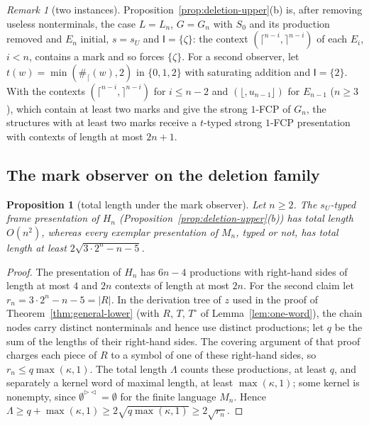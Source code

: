 \documentclass[11pt]{article}
\numberwithin{equation}{section}
\theoremstyle{plain}
\newtheorem{proposition}[theorem]{Proposition}
\theoremstyle{definition}
\theoremstyle{remark}
\newtheorem{remark}[theorem]{Remark}
\theoremstyle{plain}
\newcommand{\RL}{^{\rhd\lhd}}
\newcommand{\Lfl}{\lfloor}
\newcommand{\Rfl}{\rfloor}
\newcommand{\Lce}{\lceil}
\newcommand{\Rce}{\rceil}
\begin{document}
\begin{remark}[two instances]\label{rem:ideal-examples}
Proposition~\ref{prop:deletion-upper}(b) is, after removing useless
nonterminals, the case $L=L_n$, $G=G_n$ with
$S_0$ and its production removed and $E_n$ initial, $s=s_U$ and $\mathsf I=\{\zeta\}$: the context
$(\Lce^{n-i},\Rce^{n-i})$ of each $E_i$, $i<n$, contains a mark and so forces
$\{\zeta\}$.  For a second observer, let $t(w)=\min(\#_{\Lce}(w),2)$ in
$\{0,1,2\}$ with saturating addition and $\mathsf I=\{2\}$.  With the
contexts $(\Lce^{n-i},\Rce^{n-i})$ for $i\le n-2$ and $(\Lfl,u_{n-1}\Rfl)$ for
$E_{n-1}$ ($n\ge3$), which contain at least two marks and give the strong
$1$-FCP of $G_n$, the structures with at least two marks receive a
$t$-typed strong $1$-FCP presentation with contexts of length at most
$2n+1$.
\end{remark}

\subsection*{The mark observer on the deletion family}

\begin{proposition}[total length under the mark observer]\label{prop:mark-total}
Let $n\ge2$.  The $s_U$-typed frame presentation of $H_n$
(Proposition~\ref{prop:deletion-upper}(b)) has total length $O(n^2)$, whereas
every exemplar presentation of $M_n$, typed or not, has total length at least
$2\sqrt{3\cdot2^n-n-5}$.
\end{proposition}
\begin{proof}
The presentation of $H_n$ has $6n-4$ productions with right-hand sides of
length at most $4$ and $2n$ contexts of length at most $2n$.  For the second
claim let $r_n=3\cdot2^n-n-5=|R|$.  In the derivation tree of $z$ used in the
proof of Theorem~\ref{thm:general-lower} (with $R$, $T$, $T^\circ$ of
Lemma~\ref{lem:one-word}), the chain nodes carry distinct nonterminals and
hence use distinct productions; let $q$ be the sum of the lengths of their
right-hand sides.  The covering argument of that proof charges each piece of
$R$ to a symbol of one of these right-hand sides, so $r_n\le q\max(\kappa,1)$.
The total length $\Lambda$ counts these productions, at least $q$, and
separately a kernel word of maximal length, at least $\max(\kappa,1)$; some
kernel is nonempty, since $\emptyset\RL=\emptyset$ for the finite language
$M_n$.  Hence $\Lambda\ge q+\max(\kappa,1)\ge2\sqrt{q\max(\kappa,1)}\ge2\sqrt{r_n}$.
\end{proof}
\end{document}
